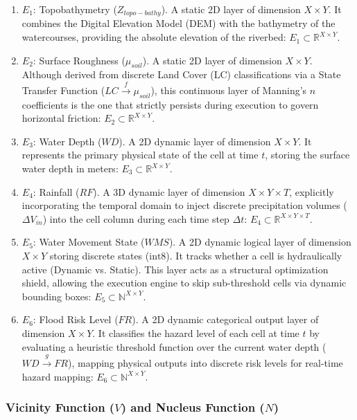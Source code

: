 \begin{enumerate}
    \item $E_1$: Topobathymetry ($Z_{topo-bathy}$). A static 2D layer of dimension $X \times Y$. It combines the Digital 
    Elevation Model (DEM) with the bathymetry of the watercourses, providing the absolute elevation of the riverbed: 
    $E_1 \subset \mathbb{R}^{X \times Y}$.
    \item $E_2$: Surface Roughness ($\mu_{soil}$). A static 2D layer of dimension $X \times Y$. Although derived from discrete 
    Land Cover (LC) classifications via a State Transfer Function ($LC \xrightarrow{f} \mu_{soil}$), this continuous layer of 
    Manning's $n$ coefficients is the one that strictly persists during execution to govern horizontal friction: 
    $E_2 \subset \mathbb{R}^{X \times Y}$.
    \item $E_3$: Water Depth ($WD$). A 2D dynamic layer of dimension $X \times Y$. It represents the primary physical state of the cell 
    at time $t$, storing the surface water depth in meters: 
    $E_3 \subset \mathbb{R}^{X \times Y}$.
    \item $E_4$: Rainfall ($RF$). A 3D dynamic layer of dimension $X \times Y \times T$, explicitly incorporating the temporal 
    domain to inject discrete precipitation volumes ($\Delta V_{in}$) into the cell column during each time step $\Delta t$: 
    $E_4 \subset \mathbb{R}^{X \times Y \times T}$.
    \item $E_5$: Water Movement State ($WMS$). A 2D dynamic logical layer of dimension $X \times Y$ storing discrete states ($\text{int8}$). 
    It tracks whether a cell is hydraulically active (Dynamic vs. Static). This layer acts as a structural optimization shield, allowing 
    the execution engine to skip sub-threshold cells via dynamic bounding boxes: 
    $E_5 \subset \mathbb{N}^{X \times Y}$.
    \item $E_6$: Flood Risk Level ($FR$). A 2D dynamic categorical output layer of dimension $X \times Y$. It classifies the hazard level 
    of each cell at time $t$ by evaluating a heuristic threshold function over the current water depth ($WD \xrightarrow{g} FR$), mapping 
    physical outputs into discrete risk levels for real-time hazard mapping: 
    $E_6 \subset \mathbb{N}^{X \times Y}$.
\end{enumerate}


\subsubsection{Vicinity Function ($V$) and Nucleus Function ($N$)}

